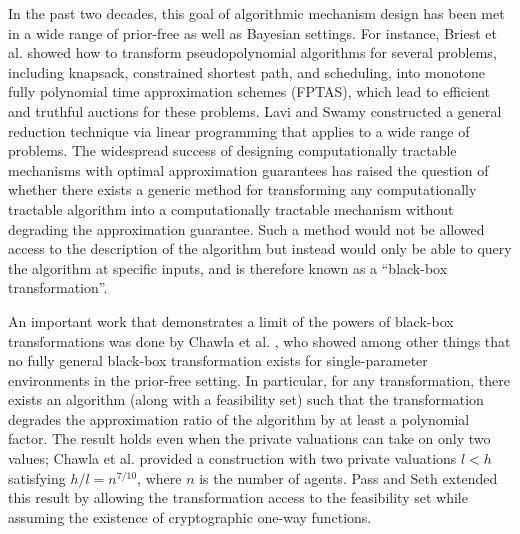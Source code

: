\documentclass[runningheads,a4paper]{llncs}
\begin{document}
In the past two decades, this goal of algorithmic mechanism design has been met in a wide range of prior-free as well as Bayesian settings. For instance, Briest et al. \cite{BriestKrVo11} showed how to transform pseudopolynomial algorithms for several problems, including knapsack, constrained shortest path, and scheduling, into monotone fully polynomial time approximation schemes (FPTAS), which lead to efficient and truthful auctions for these problems. Lavi and Swamy \cite{LaviSw11} constructed a general reduction technique via linear programming that applies to a wide range of problems. The widespread success of designing computationally tractable mechanisms with optimal approximation guarantees has raised the question of whether there exists a generic method for transforming any computationally tractable algorithm into a computationally tractable mechanism without degrading the approximation guarantee. Such a method would not be allowed access to the description of the algorithm but instead would only be able to query the algorithm at specific inputs, and is therefore known as a ``black-box transformation''.

An important work that demonstrates a limit of the powers of black-box transformations was done by Chawla et al. \cite{ChawlaImLu12}, who showed among other things that no fully general black-box transformation exists for single-parameter environments in the prior-free setting. In particular, for any transformation, there exists an algorithm (along with a feasibility set) such that the transformation degrades the approximation ratio of the algorithm by at least a polynomial factor. The result holds even when the private valuations can take on only two values; Chawla et al. provided a construction with two private valuations $l<h$ satisfying $h/l=n^{7/10}$, where $n$ is the number of agents. Pass and Seth \cite{PassSe14} extended this result by allowing the transformation access to the feasibility set while assuming the existence of cryptographic one-way functions. 
\end{document}
